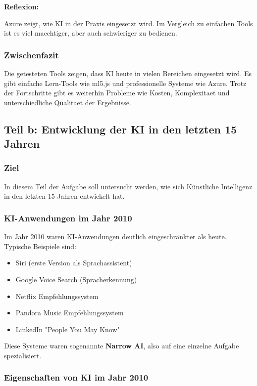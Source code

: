 \documentclass[12pt,a4paper]{article}
\begin{document}
\textbf{Reflexion:}

Azure zeigt, wie KI in der Praxis eingesetzt wird. Im Vergleich zu einfachen Tools ist es viel
maechtiger, aber auch schwieriger zu bedienen.

\subsubsection*{Zwischenfazit}

Die getesteten Tools zeigen, dass KI heute in vielen Bereichen eingesetzt wird.
Es gibt einfache Lern-Tools wie ml5.js und professionelle Systeme wie Azure.
Trotz der Fortschritte gibt es weiterhin Probleme wie Kosten, Komplexitaet und
unterschiedliche Qualitaet der Ergebnisse.

\subsection{Teil b: Entwicklung der KI in den letzten 15 Jahren}

\subsubsection*{Ziel}

In diesem Teil der Aufgabe soll untersucht werden, wie sich Künstliche Intelligenz
in den letzten 15 Jahren entwickelt hat.

\subsubsection*{KI-Anwendungen im Jahr 2010}

Im Jahr 2010 waren KI-Anwendungen deutlich eingeschränkter als heute.
Typische Beispiele sind:

\begin{itemize}
    \item Siri (erste Version als Sprachassistent)
    \item Google Voice Search (Spracherkennung)
    \item Netflix Empfehlungssystem
    \item Pandora Music Empfehlungssystem
    \item LinkedIn "People You May Know"
\end{itemize}

Diese Systeme waren sogenannte \textbf{Narrow AI}, also auf eine einzelne Aufgabe spezialisiert.

\subsubsection*{Eigenschaften von KI im Jahr 2010}
\end{document}
